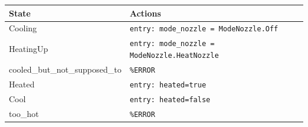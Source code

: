 \begin{tabular}{@{}lp{}@{}}
\toprule
State & Actions \\
\midrule
Cooling & \texttt{entry: mode\_nozzle = ModeNozzle.Off} \\
HeatingUp & \texttt{entry: mode\_nozzle = ModeNozzle.HeatNozzle} \\
cooled\_but\_not\_supposed\_to & \texttt{\%ERROR} \\
Heated & \texttt{entry: heated=true} \\
Cool & \texttt{entry: heated=false} \\
too\_hot & \texttt{\%ERROR} \\
\bottomrule
\end{tabular}
